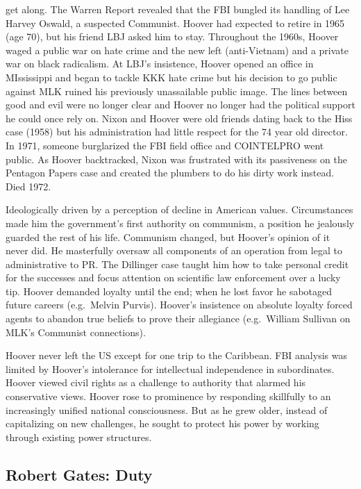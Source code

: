 \documentclass[
]{article}
\begin{document}
get along. The Warren Report revealed that the FBI bungled its handling
of Lee Harvey Oswald, a suspected Communist. Hoover had expected to
retire in 1965 (age 70), but his friend LBJ asked him to stay.
Throughout the 1960s, Hoover waged a public war on hate crime and the
new left (anti-Vietnam) and a private war on black radicalism. At LBJ's
insistence, Hoover opened an office in MIssissippi and began to tackle
KKK hate crime but his decision to go public against MLK ruined his
previously unassailable public image. The lines between good and evil
were no longer clear and Hoover no longer had the political support he
could once rely on. Nixon and Hoover were old friends dating back to the
Hiss case (1958) but his administration had little respect for the 74
year old director. In 1971, someone burglarized the FBI field office and
COINTELPRO went public. As Hoover backtracked, Nixon was frustrated with
its passiveness on the Pentagon Papers case and created the plumbers to
do his dirty work instead. Died 1972.

Ideologically driven by a perception of decline in American values.
Circumstances made him the government's first authority on communism, a
position he jealously guarded the rest of his life. Communism changed,
but Hoover's opinion of it never did. He masterfully oversaw all
components of an operation from legal to administrative to PR. The
Dillinger case taught him how to take personal credit for the successes
and focus attention on scientific law enforcement over a lucky tip.
Hoover demanded loyalty until the end; when he lost favor he sabotaged
future careers (e.g.~Melvin Purvis). Hoover's insistence on absolute
loyalty forced agents to abandon true beliefs to prove their allegiance
(e.g.~William Sullivan on MLK's Communist connections).

Hoover never left the US except for one trip to the Caribbean. FBI
analysis was limited by Hoover's intolerance for intellectual
independence in subordinates. Hoover viewed civil rights as a challenge
to authority that alarmed his conservative views. Hoover rose to
prominence by responding skillfully to an increasingly unified national
consciousness. But as he grew older, instead of capitalizing on new
challenges, he sought to protect his power by working through existing
power structures.

\hypertarget{robert-gates-duty}{%
\subsection{Robert Gates: Duty}\label{robert-gates-duty}}
\end{document}
